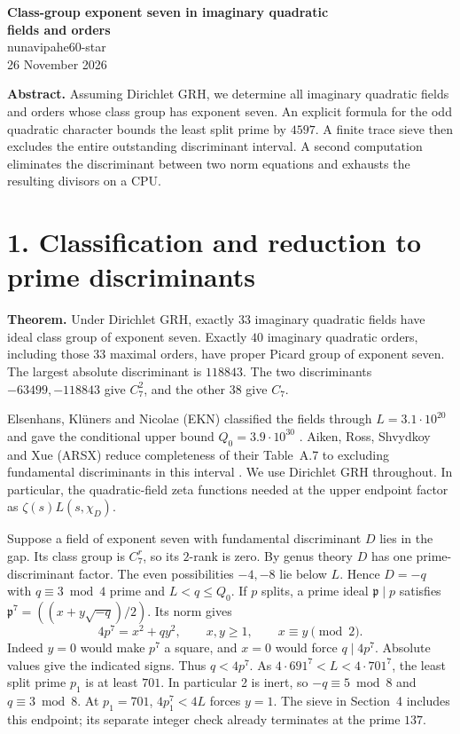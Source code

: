 \documentclass[11pt,letterpaper]{article}
\newcommand{\sect}[1]{\section*{#1}}
\begin{document}
\begin{center}
{\Large\bfseries Class-group exponent seven in imaginary quadratic\\[2pt]
fields and orders}\\[8pt]
{\large nunavipahe60-star}\\[3pt]
26 November 2026
\end{center}

\textbf{Abstract.}
Assuming Dirichlet GRH, we determine all imaginary quadratic fields and orders
whose class group has exponent seven. An explicit formula for the odd quadratic
character bounds the least split prime by \(4597\). A finite trace sieve then
excludes the entire outstanding discriminant interval. A second computation
eliminates the discriminant between two norm equations and exhausts the
resulting divisors on a CPU.

\sect{1. Classification and reduction to prime discriminants}
\textbf{Theorem.} Under Dirichlet GRH, exactly \(33\) imaginary quadratic fields
have ideal class group of exponent seven. Exactly \(40\) imaginary quadratic
orders, including those \(33\) maximal orders, have proper Picard group of
exponent seven. The largest absolute discriminant is \(118843\). The two
discriminants \(-63499,-118843\) give \(C_7^2\), and the other \(38\) give \(C_7\).

Elsenhans, Kl\"uners and Nicolae (EKN) classified the fields through
\(L=3.1\cdot10^{20}\) and gave the conditional upper bound
\(Q_0=3.9\cdot10^{30}\) \cite[Theorems 1, 3 and Tables 1--2]{EKN}.
Aiken, Ross, Shvydkoy and Xue (ARSX) reduce completeness of their Table~A.7
to excluding fundamental discriminants in this interval
\cite[Theorem 1.3(6)]{ARSX}. We use Dirichlet GRH throughout. In particular,
the quadratic-field zeta functions needed at the upper endpoint factor as
\(\zeta(s)L(s,\chi_D)\).

Suppose a field of exponent seven with fundamental discriminant \(D\) lies
in the gap. Its class group is \(C_7^r\), so its \(2\)-rank is zero. By genus theory
\(D\) has one prime-discriminant factor. The even possibilities \(-4,-8\)
lie below \(L\). Hence \(D=-q\) with \(q\equiv3\bmod4\) prime and \(L<q\le Q_0\).
If \(p\) splits, a prime ideal \(\mathfrak p\mid p\) satisfies
\(\mathfrak p^7=((x+y\sqrt{-q})/2)\). Its norm gives
\begin{equation}
 4p^7=x^2+qy^2,\qquad x,y\ge1,\qquad x\equiv y\pmod2 .
 \label{eq:norm}
\end{equation}
Indeed \(y=0\) would make \(p^7\) a square, and \(x=0\) would force
\(q\mid4p^7\). Absolute values give the indicated signs. Thus \(q<4p^7\).
As \(4\cdot691^7<L<4\cdot701^7\), the least split prime \(p_1\) is at least
\(701\). In particular 2 is inert, so \(-q\equiv5\bmod8\) and \(q\equiv3\bmod8\).
At \(p_1=701\), \(4p_1^7<4L\) forces \(y=1\). The sieve in Section~4 includes
this endpoint; its separate integer check already terminates at the prime \(137\).
\end{document}
